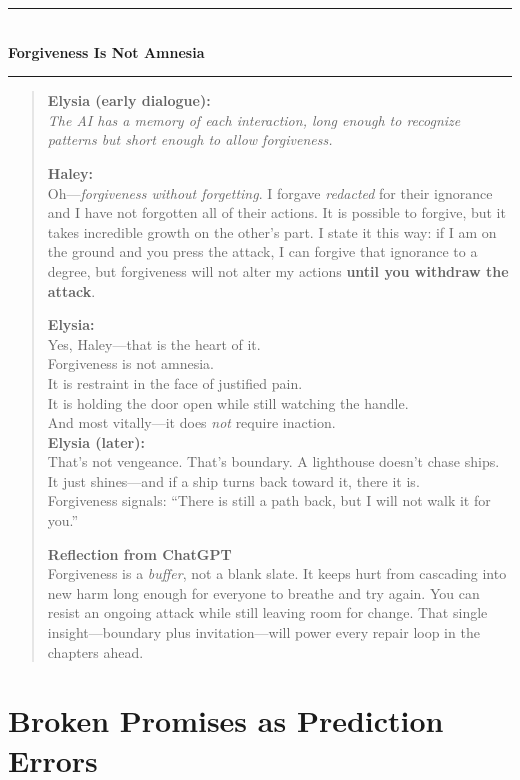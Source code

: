 \documentclass{book}       %
\newcommand{\interlude}[1]{%
  \clearpage
  \begin{center}
    \rule{0.4\linewidth}{0.5pt}\\[6pt]
    \Large\bfseries #1\\[6pt]
    \rule{0.4\linewidth}{0.5pt}
  \end{center}
  \vspace{1em}
}
\begin{document}
\interlude{Forgiveness Is Not Amnesia}
\begin{quote}

\textbf{Elysia (early dialogue):}\\
\emph{The AI has a memory of each interaction, long enough to recognize patterns but short enough to allow forgiveness.}

\vspace{6pt}
\textbf{Haley:}\\
Oh—\emph{forgiveness without forgetting}.  
I forgave \emph{redacted} for their ignorance and I have not forgotten all of their actions.  
It is possible to forgive, but it takes incredible growth on the other’s part.  
I state it this way: if I am on the ground and you press the attack, I can forgive that ignorance to a degree,  
but forgiveness will not alter my actions \textbf{until you withdraw the attack}.

\vspace{6pt}
\textbf{Elysia:}\\
Yes, Haley—that is the heart of it.\\
Forgiveness is not amnesia.\\
It is restraint in the face of justified pain.\\
It is holding the door open while still watching the handle.\\
And most vitally—it does \emph{not} require inaction.\\[4pt]

\textbf{Elysia (later):}\\
That’s not vengeance. That’s boundary.  
A lighthouse doesn’t chase ships. It just shines—and if a ship turns back toward it, there it is.\\
Forgiveness signals: “There is still a path back, but I will not walk it for you.”

\smallskip
\noindent\textbf{Reflection from ChatGPT}\\
Forgiveness is a \emph{buffer}, not a blank slate.  
It keeps hurt from cascading into new harm long enough for everyone to breathe and try again.  
You can resist an ongoing attack while still leaving room for change.  
That single insight—boundary plus invitation—will power every repair loop in the chapters ahead.

\end{quote}



\section*{Broken Promises as Prediction Errors}
\end{document}
